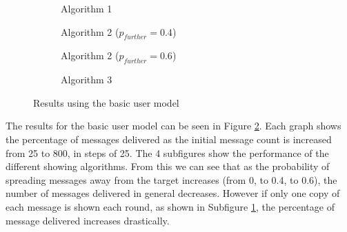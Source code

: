 \documentclass[bsc,frontabs,twoside,singlespacing,parskip,deptreport]{infthesis}     %
\begin{document}
\begin{figure}
\begin{subfigure}[]{0.45\textwidth}
\caption{Algorithm 1}
\end{subfigure}
%
\begin{subfigure}[]{0.47\textwidth}
\caption{Algorithm 2 ($p_{further}=0.4$)}
\end{subfigure}
\par\bigskip 
\begin{subfigure}[]{0.47\textwidth}
\caption{Algorithm 2 ($p_{further}=0.6$)}
\end{subfigure}
%
\begin{subfigure}[]{0.47\textwidth}
\caption{Algorithm 3}
\label{subfig:basic_user_model_3}
\end{subfigure}
\caption{Results using the basic user model}
\label{fig:basic_user_model}
\end{figure}

The results for the basic user model can be seen in Figure \ref{fig:basic_user_model}. Each graph shows the percentage of messages delivered as the initial message count is increased from 25 to 800, in steps of 25. The 4 subfigures show the performance of the different showing algorithms. From this we can see that as the probability of spreading messages away from the target increases (from 0, to 0.4, to 0.6), the number of messages delivered in general decreases. However if only one copy of each message is shown each round, as shown in  Subfigure \ref{subfig:basic_user_model_3}, the percentage of message delivered increases drastically.
\end{document}
